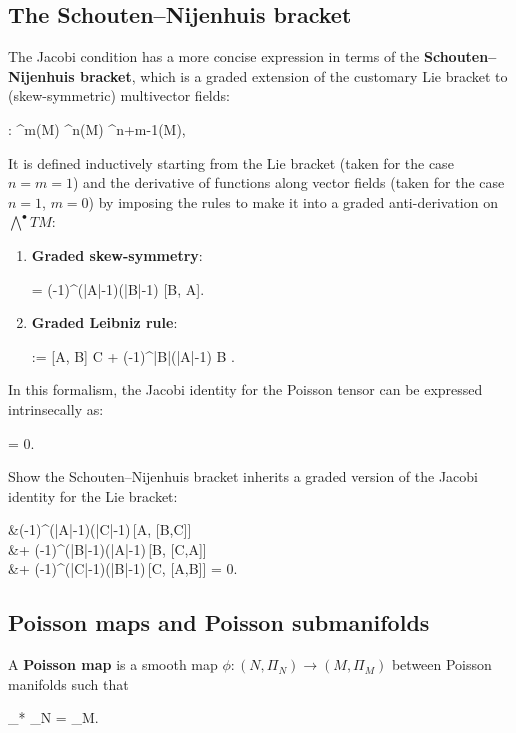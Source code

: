 \documentclass[main.tex]{subfiles}
\begin{document}
\subsection{The Schouten--Nijenhuis bracket}
The Jacobi condition has a more concise expression in terms of the \textbf{Schouten--Nijenhuis bracket}, which is a graded extension of the customary Lie bracket to (skew-symmetric) multivector fields:
\begin{eqalign}
	[-, -] : \fields^m(M) \times \fields^n(M) \longto \fields^{n+m-1}(M), 
\end{eqalign}
It is defined inductively starting from the Lie bracket (taken for the case $n=m=1$) and the derivative of functions along vector fields (taken for the case $n=1$, $m=0$) by imposing the rules to make it into a graded anti-derivation on $\bigwedge^\bullet TM$:
\begin{enumerate}
	\item \textbf{Graded skew-symmetry}:
	\begin{eqalign}
		[A,B] = (-1)^{(|A|-1)(|B|-1)} [B, A].
	\end{eqalign}
	\item \textbf{Graded Leibniz rule}:
	\begin{eqalign}
		[A,B \wedge C] := [A, B] \wedge C + (-1)^{|B|(|A|-1)} B \wedge [A,C].
	\end{eqalign}
\end{enumerate}

In this formalism, the Jacobi identity for the Poisson tensor can be expressed intrinsecally as:
\begin{eqalign}
	[\Pi, \Pi] = 0.
\end{eqalign}

\begin{exercise}
\label{ex:graded_jacobi}
	Show the Schouten--Nijenhuis bracket inherits a graded version of the Jacobi identity for the Lie bracket:
	\begin{eqalign}
		&(-1)^{(|A|-1)(|C|-1)}\,[A, [B,C]]\\
			&\qquad \qquad + (-1)^{(|B|-1)(|A|-1)}\,[B, [C,A]]\\
				&\qquad \qquad \qquad \qquad + (-1)^{(|C|-1)(|B|-1)}\,[C, [A,B]] = 0.
	\end{eqalign}
\end{exercise}

\subsection{Poisson maps and Poisson submanifolds}
\begin{definition}
	A \textbf{Poisson map} is a smooth map $\phi : (N, \Pi_N) \to (M, \Pi_M)$ between Poisson manifolds such that
	\begin{eqalign}
	\label{eq:poisson_map_condition}
		\phi_* \Pi_N = \Pi_M.
	\end{eqalign}
\end{definition}
\end{document}
